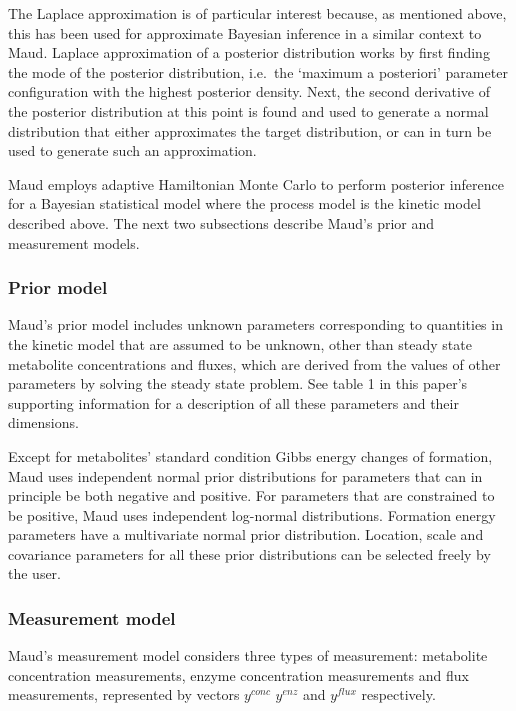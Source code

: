 \documentclass[journal=asbcd6,manuscript=article,layout=traditional]{achemso}
\begin{document}
The Laplace approximation is of particular interest because, as
mentioned above, this has been used for approximate Bayesian inference
in a similar context to Maud. Laplace approximation of a posterior
distribution works by first finding the mode of the posterior
distribution, i.e.~the `maximum a posteriori' parameter configuration
with the highest posterior density. Next, the second derivative of the
posterior distribution at this point is found and used to generate a
normal distribution that either approximates the target distribution, or
can in turn be used to generate such an approximation.

Maud employs adaptive Hamiltonian Monte Carlo to perform posterior
inference for a Bayesian statistical model where the process model is
the kinetic model described above. The next two subsections describe
Maud's prior and measurement models.

\hypertarget{prior-model}{%
\subsubsection{Prior model}\label{prior-model}}

Maud's prior model includes unknown parameters corresponding to
quantities in the kinetic model that are assumed to be unknown, other
than steady state metabolite concentrations and fluxes, which are
derived from the values of other parameters by solving the steady state
problem. See table 1 in this paper's supporting information for a
description of all these parameters and their dimensions.

Except for metabolites' standard condition Gibbs energy changes of
formation, Maud uses independent normal prior distributions for
parameters that can in principle be both negative and positive. For
parameters that are constrained to be positive, Maud uses independent
log-normal distributions. Formation energy parameters have a
multivariate normal prior distribution. Location, scale and covariance
parameters for all these prior distributions can be selected freely by
the user.

\hypertarget{measurement-model}{%
\subsubsection{Measurement model}\label{measurement-model}}

Maud's measurement model considers three types of measurement:
metabolite concentration measurements, enzyme concentration measurements
and flux measurements, represented by vectors \(𝑦^{𝑐𝑜𝑛𝑐}\) \(𝑦^{𝑒𝑛𝑧}\)
and \(𝑦^{𝑓𝑙𝑢𝑥}\) respectively.
\end{document}
